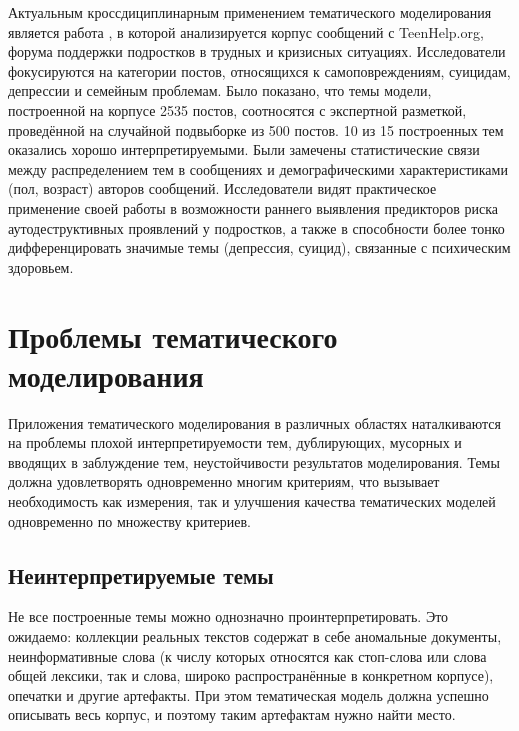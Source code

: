 Актуальным кроссдициплинарным применением тематического моделирования является работа \cite{franz2020using}, в которой анализируется корпус сообщений с TeenHelp.org, форума  поддержки подростков в трудных и кризисных ситуациях. Исследователи фокусируются на категории постов, относящихся к самоповреждениям, суицидам, депрессии и семейным проблемам. Было показано, что темы модели, построенной на корпусе 2535 постов, соотносятся с экспертной разметкой, проведённой на случайной подвыборке из 500 постов. 10 из 15 построенных тем оказались хорошо интерпретируемыми. Были замечены статистические связи между распределением тем в сообщениях и демографическими характеристиками (пол, возраст) авторов сообщений.
Исследователи видят практическое применение своей работы в возможности раннего выявления предикторов риска аутодеструктивных проявлений у подростков, а также в способности более тонко дифференцировать значимые темы (депрессия, суицид), связанные с психическим здоровьем.


\section{Проблемы тематического моделирования}

Приложения тематического моделирования в различных областях наталкиваются на проблемы плохой интерпретируемости тем, дублирующих, мусорных и вводящих в заблуждение тем, неустойчивости результатов моделирования.
Темы должна удовлетворять одновременно многим критериям, что вызывает необходимость как измерения, так и улучшения качества тематических моделей одновременно по множеству критериев.

\subsection{Неинтерпретируемые темы}

Не все построенные темы можно однозначно проинтерпретировать. Это ожидаемо: коллекции реальных текстов содержат в себе аномальные документы, неинформативные слова (к числу которых относятся как стоп-слова или слова общей лексики, так и слова, широко распространённые в конкретном корпусе), опечатки и другие артефакты. При этом тематическая модель должна успешно описывать весь корпус, и поэтому таким артефактам нужно найти место.

